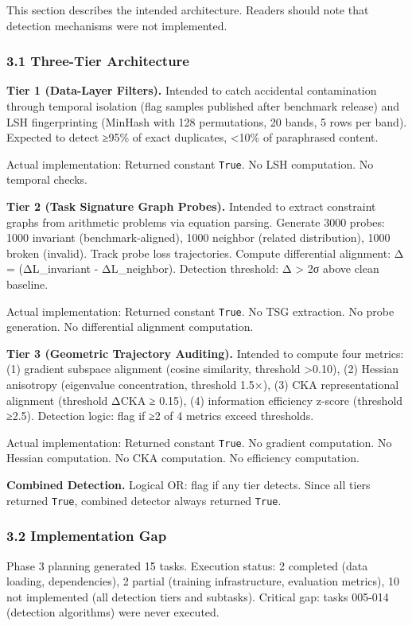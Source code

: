
This section describes the intended architecture. Readers should note that detection mechanisms were not implemented.

\subsubsection{3.1 Three-Tier Architecture}

\textbf{Tier 1 (Data-Layer Filters).} Intended to catch accidental contamination through temporal isolation (flag samples published after benchmark release) and LSH fingerprinting (MinHash with 128 permutations, 20 bands, 5 rows per band). Expected to detect ≥95\% of exact duplicates, <10\% of paraphrased content.

Actual implementation: Returned constant \texttt{True}. No LSH computation. No temporal checks.

\textbf{Tier 2 (Task Signature Graph Probes).} Intended to extract constraint graphs from arithmetic problems via equation parsing. Generate 3000 probes: 1000 invariant (benchmark-aligned), 1000 neighbor (related distribution), 1000 broken (invalid). Track probe loss trajectories. Compute differential alignment: Δ = (ΔL_invariant - ΔL_neighbor). Detection threshold: Δ > 2σ above clean baseline.

Actual implementation: Returned constant \texttt{True}. No TSG extraction. No probe generation. No differential alignment computation.

\textbf{Tier 3 (Geometric Trajectory Auditing).} Intended to compute four metrics: (1) gradient subspace alignment (cosine similarity, threshold >0.10), (2) Hessian anisotropy (eigenvalue concentration, threshold 1.5×), (3) CKA representational alignment (threshold ΔCKA ≥ 0.15), (4) information efficiency z-score (threshold ≥2.5). Detection logic: flag if ≥2 of 4 metrics exceed thresholds.

Actual implementation: Returned constant \texttt{True}. No gradient computation. No Hessian computation. No CKA computation. No efficiency computation.

\textbf{Combined Detection.} Logical OR: flag if any tier detects. Since all tiers returned \texttt{True}, combined detector always returned \texttt{True}.

\subsubsection{3.2 Implementation Gap}

Phase 3 planning generated 15 tasks. Execution status: 2 completed (data loading, dependencies), 2 partial (training infrastructure, evaluation metrics), 10 not implemented (all detection tiers and subtasks). Critical gap: tasks 005-014 (detection algorithms) were never executed.
